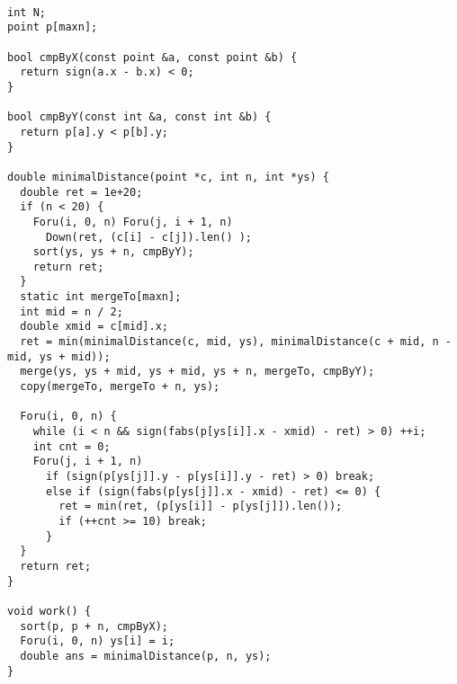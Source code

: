 \begin{lstlisting}

int N;
point p[maxn];

bool cmpByX(const point &a, const point &b) {
  return sign(a.x - b.x) < 0; 
}

bool cmpByY(const int &a, const int &b) {
  return p[a].y < p[b].y; 
}

double minimalDistance(point *c, int n, int *ys) {
  double ret = 1e+20;
  if (n < 20) {
    Foru(i, 0, n) Foru(j, i + 1, n)
      Down(ret, (c[i] - c[j]).len() );
    sort(ys, ys + n, cmpByY);
    return ret; 
  }
  static int mergeTo[maxn];
  int mid = n / 2;
  double xmid = c[mid].x;
  ret = min(minimalDistance(c, mid, ys), minimalDistance(c + mid, n - mid, ys + mid));
  merge(ys, ys + mid, ys + mid, ys + n, mergeTo, cmpByY);
  copy(mergeTo, mergeTo + n, ys);

  Foru(i, 0, n) {
    while (i < n && sign(fabs(p[ys[i]].x - xmid) - ret) > 0) ++i;
    int cnt = 0;
    Foru(j, i + 1, n)
      if (sign(p[ys[j]].y - p[ys[i]].y - ret) > 0) break;
      else if (sign(fabs(p[ys[j]].x - xmid) - ret) <= 0) {
        ret = min(ret, (p[ys[i]] - p[ys[j]]).len());
        if (++cnt >= 10) break;
      }
  }
  return ret; 
}

void work() {
  sort(p, p + n, cmpByX);
  Foru(i, 0, n) ys[i] = i;
  double ans = minimalDistance(p, n, ys);
}

\end{lstlisting}